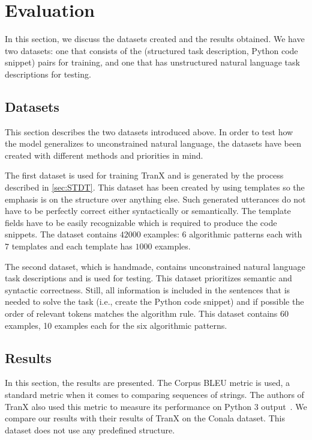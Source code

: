 \section{Evaluation}

In this section, we discuss the datasets created and the results obtained. We
have two datasets: one that consists of the (structured task description, Python
code snippet) pairs for training, and one that has unstructured natural language
task descriptions for testing.

\subsection{Datasets}

This section describes the two datasets introduced above. In order to test how
the model generalizes to unconstrained natural language, the datasets have been
created with different methods and priorities in mind.

The first dataset is used for training TranX and is generated by the process
described in \cref{sec:STDT}. This dataset has been created by using templates so
the emphasis is on the structure over anything else. Such generated utterances
do not have to be perfectly correct either syntactically or semantically. The
template fields have to be easily recognizable which is required to produce the
code snippets. The dataset contains \( 42000 \) examples: \( 6 \) algorithmic
patterns each with \( 7 \) templates and each template has \( 1000 \) examples.

The second dataset, which is handmade, contains unconstrained natural language
task descriptions and is used for testing. This dataset prioritizes semantic and
syntactic correctness. Still, all information is included in the sentences that
is needed to solve the task (i.e., create the Python code snippet) and if
possible the order of relevant tokens matches the algorithm rule. This dataset
contains \( 60 \) examples, 10 examples each for the six algorithmic patterns.

\subsection{Results}

In this section, the results are presented. The Corpus BLEU\cite{bleu} metric is
used, a standard metric when it comes to comparing sequences of strings. The
authors of TranX also used this metric to measure its performance on Python 3
output~\cite{tranxRepo}. We compare our results with their results of TranX on
the Conala\cite{conala} dataset. This dataset does not use any predefined
structure.

